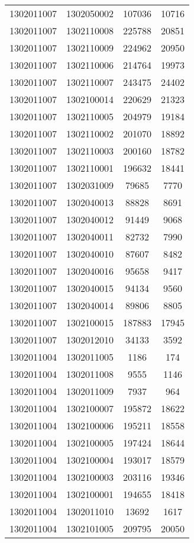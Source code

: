 \begin{longtable}[h]{llcc}
		1302011007 & 1302050002 & 107036 & 10716\\
		1302011007 & 1302110008 & 225788 & 20851\\
		1302011007 & 1302110009 & 224962 & 20950\\
		1302011007 & 1302110006 & 214764 & 19973\\
		1302011007 & 1302110007 & 243475 & 24402\\
		1302011007 & 1302100014 & 220629 & 21323\\
		1302011007 & 1302110005 & 204979 & 19184\\
		1302011007 & 1302110002 & 201070 & 18892\\
		1302011007 & 1302110003 & 200160 & 18782\\
		1302011007 & 1302110001 & 196632 & 18441\\
		1302011007 & 1302031009 & 79685 & 7770\\
		1302011007 & 1302040013 & 88828 & 8691\\
		1302011007 & 1302040012 & 91449 & 9068\\
		1302011007 & 1302040011 & 82732 & 7990\\
		1302011007 & 1302040010 & 87607 & 8482\\
		1302011007 & 1302040016 & 95658 & 9417\\
		1302011007 & 1302040015 & 94134 & 9560\\
		1302011007 & 1302040014 & 89806 & 8805\\
		1302011007 & 1302100015 & 187883 & 17945\\
		1302011007 & 1302012010 & 34133 & 3592\\
		1302011004 & 1302011005 & 1186 & 174\\
		1302011004 & 1302011008 & 9555 & 1146\\
		1302011004 & 1302011009 & 7937 & 964\\
		1302011004 & 1302100007 & 195872 & 18622\\
		1302011004 & 1302100006 & 195211 & 18558\\
		1302011004 & 1302100005 & 197424 & 18644\\
		1302011004 & 1302100004 & 193017 & 18579\\
		1302011004 & 1302100003 & 203116 & 19346\\
		1302011004 & 1302100001 & 194655 & 18418\\
		1302011004 & 1302011010 & 13692 & 1617\\
		1302011004 & 1302101005 & 209795 & 20050\\

\end{longtable}
